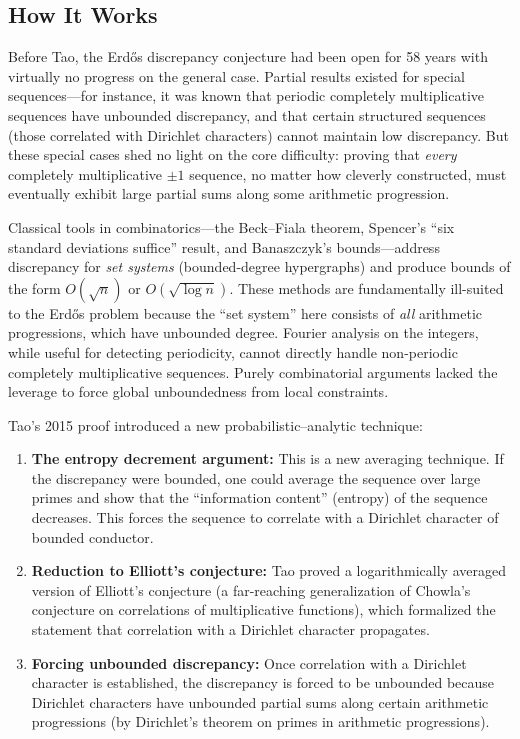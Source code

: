 \subsection{How It Works}

Before Tao, the Erd\H{o}s discrepancy conjecture had been open for 58 years with virtually no progress on the general case. Partial results existed for special sequences---for instance, it was known that periodic completely multiplicative sequences have unbounded discrepancy, and that certain structured sequences (those correlated with Dirichlet characters) cannot maintain low discrepancy. But these special cases shed no light on the core difficulty: proving that \emph{every} completely multiplicative $\pm 1$ sequence, no matter how cleverly constructed, must eventually exhibit large partial sums along some arithmetic progression.

Classical tools in combinatorics---the Beck--Fiala theorem, Spencer's ``six standard deviations suffice'' result, and Banaszczyk's bounds---address discrepancy for \emph{set systems} (bounded-degree hypergraphs) and produce bounds of the form $O(\sqrt{n})$ or $O(\sqrt{\log n})$. These methods are fundamentally ill-suited to the Erd\H{o}s problem because the ``set system'' here consists of \emph{all} arithmetic progressions, which have unbounded degree. Fourier analysis on the integers, while useful for detecting periodicity, cannot directly handle non-periodic completely multiplicative sequences. Purely combinatorial arguments lacked the leverage to force global unboundedness from local constraints.

Tao's 2015 proof introduced a new probabilistic--analytic technique:
\begin{enumerate}
\item \textbf{The entropy decrement argument:} This is a new averaging technique. If the discrepancy were bounded, one could average the sequence over large primes and show that the ``information content'' (entropy) of the sequence decreases. This forces the sequence to correlate with a Dirichlet character of bounded conductor.
\item \textbf{Reduction to Elliott's conjecture:} Tao proved a logarithmically averaged version of Elliott's conjecture (a far-reaching generalization of Chowla's conjecture on correlations of multiplicative functions), which formalized the statement that correlation with a Dirichlet character propagates.
\item \textbf{Forcing unbounded discrepancy:} Once correlation with a Dirichlet character is established, the discrepancy is forced to be unbounded because Dirichlet characters have unbounded partial sums along certain arithmetic progressions (by Dirichlet's theorem on primes in arithmetic progressions).
\end{enumerate}

